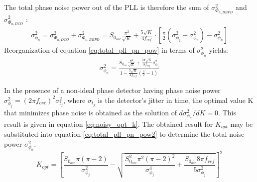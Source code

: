 			The total phase noise power out of the PLL is therefore the sum of $\sigma_{\Phi_{n,BBPD}}^2$ and $\sigma_{\Phi_{n,DCO}}^2$ : 
			\begin{align} \label{eq:total_pll_pn_pow}
				\sigma^2_{\phi_n}  = \sigma_{\Phi_{n,DCO}}^2 + \sigma_{\Phi_{n,BBPD}}^2 =
				S_{0_{osc}}\frac{\pi^2}{\sqrt{K}} +
				\frac{5\sqrt{K}}{4f_{ref}}\cdot\left[\frac{\pi}{2}(\sigma^2_{\phi_j} +
				\sigma^2_{\phi_n})-\sigma^2_{\phi_n}\right] 
			\end{align} 
			Reorganization of equation \ref{eq:total_pll_pn_pow} in terms of $\sigma^2_{\phi_n}$ yields:
			\begin{align} \label{eq:total_pll_pn_pow2} \sigma^2_{\phi_n}  =
				\frac{S_{0_{osc}}\frac{\pi^2}{\sqrt{K}} +
				\frac{5\pi\sqrt{K}}{8f_{ref}}\sigma^2_{\phi_j}}{1-\frac{5\sqrt{K}}{4f_{ref}}(\frac{\pi}{2}-1)}
			\end{align}			 



			In the presence of a non-ideal phase detector having phase noise power $\sigma^2_{\phi_j} = (2\pi f_{osc})^2\sigma^2_{t_j}$, where $\sigma_{t_j}$ is the detector's jitter in time, the optimal value K that minimizes phase noise is obtained as the solution of $d\sigma^2_{\phi_n}/dK = 0$. This result is given in equation \ref{eq:noisy_opt_k}. The obtained result for $K_{opt}$ may be substituted into equation \ref{eq:total_pll_pn_pow2} to determine the total noise power $\sigma^2_{\phi_n}$. 
			\begin{equation}\label{eq:noisy_opt_k}
				K_{opt} = \left[\frac{S_{0_{osc}}\pi(\pi-2)}{\sigma^2_{\phi_j}} -
				\sqrt{\frac{S_{0_{osc}}^2\pi^2(\pi-2)^2}{\sigma^4_{\phi_j}} +
				\frac{S_{0_{osc}}8\pi f_{ref}}{5\sigma^2_{\phi_j}}} \right]^2 
			\end{equation}

